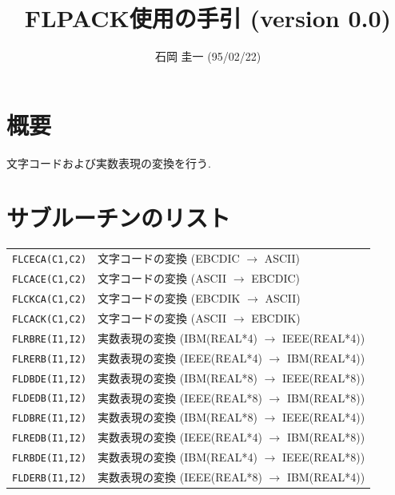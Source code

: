 %
%

\title{FLPACK使用の手引 (version 0.0)}
\author{石岡 圭一  (95/02/22)}
\date{}



\maketitle

\section{概要}

文字コードおよび実数表現の変換を行う.

\section{サブルーチンのリスト}
\begin{tabular}{lp{10cm}}
  {\tt FLCECA(C1,C2)}  & 文字コードの変換 (EBCDIC $\to$ ASCII) \\
  {\tt FLCACE(C1,C2)}  & 文字コードの変換 (ASCII $\to$ EBCDIC) \\
  {\tt FLCKCA(C1,C2)}  & 文字コードの変換 (EBCDIK $\to$ ASCII) \\
  {\tt FLCACK(C1,C2)}  & 文字コードの変換 (ASCII $\to$ EBCDIK) \\
  {\tt FLRBRE(I1,I2)}  & 実数表現の変換 (IBM(REAL*4) $\to$ IEEE(REAL*4)) \\
  {\tt FLRERB(I1,I2)}  & 実数表現の変換 (IEEE(REAL*4) $\to$ IBM(REAL*4)) \\
  {\tt FLDBDE(I1,I2)}  & 実数表現の変換 (IBM(REAL*8) $\to$ IEEE(REAL*8)) \\
  {\tt FLDEDB(I1,I2)}  & 実数表現の変換 (IEEE(REAL*8) $\to$ IBM(REAL*8)) \\
  {\tt FLDBRE(I1,I2)}  & 実数表現の変換 (IBM(REAL*8) $\to$ IEEE(REAL*4)) \\
  {\tt FLREDB(I1,I2)}  & 実数表現の変換 (IEEE(REAL*4) $\to$ IBM(REAL*8)) \\
  {\tt FLRBDE(I1,I2)}  & 実数表現の変換 (IBM(REAL*4) $\to$ IEEE(REAL*8)) \\
  {\tt FLDERB(I1,I2)}  & 実数表現の変換 (IEEE(REAL*8) $\to$ IBM(REAL*4))
\end{tabular}

